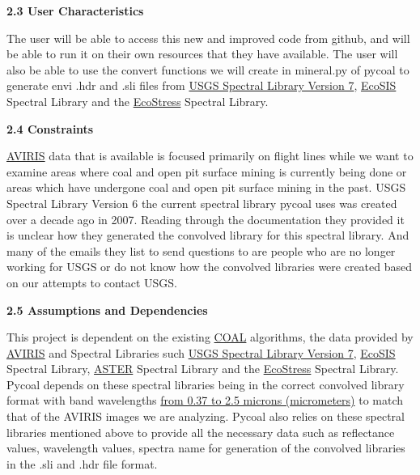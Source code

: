\documentclass[a4paper,12pt]{article}
\begin{document}
\noindent \textbf{2.3 User Characteristics}\newline


\noindent The user will be able to access this new and improved code from github, and will be able to run it on their own resources that they have available.\newline
\noindent The user will also be able to use the convert functions we will create in mineral.py of pycoal to generate envi .hdr and .sli files from \href{https://speclab.cr.usgs.gov/spectral-lib.html}{USGS Spectral Library Version 7}, \href{https://ecosis.org/}{EcoSIS} Spectral Library and the \href{https://speclib.jpl.nasa.gov/}{EcoStress} Spectral Library. \newline


\noindent \textbf{2.4 Constraints}\newline

\noindent \href{https://aviris.jpl.nasa.gov/}{AVIRIS} data that is available is focused primarily on flight lines while we want to examine areas where coal and open pit surface mining is currently being done or areas which have undergone coal and open pit surface mining in the past. \newline
\noindent USGS Spectral Library Version 6 the current spectral library pycoal uses was created over a decade ago in 2007. Reading through the documentation they provided it is unclear how they generated the convolved library for this spectral library. And many of the emails they list to send questions to are people who are no longer working for USGS or do not know how the convolved libraries were created based on our attempts to contact USGS. \newline


\noindent \textbf{2.5 Assumptions and Dependencies}\newline


\noindent This project is dependent on the existing \href{https://capstone-coal.github.io/}{COAL} algorithms, the data provided by \href{https://aviris.jpl.nasa.gov/}{AVIRIS} and Spectral Libraries such \href{https://speclab.cr.usgs.gov/spectral-lib.html}{USGS Spectral Library Version 7}, \href{https://ecosis.org/}{EcoSIS} Spectral Library, \href{https://speclib.jpl.nasa.gov/downloads/2009-Baldridge.pdf}{ASTER} Spectral Library and the \href{https://speclib.jpl.nasa.gov/}{EcoStress} Spectral Library.\newline
\newline
Pycoal depends on these spectral libraries being in the correct convolved library format with band wavelengths \href{https://pubs.usgs.gov/of/2001/ofr-01-0405/ofr-01-0405.html}{from 0.37 to 2.5 microns (micrometers)} to match that of the AVIRIS images we are analyzing. Pycoal also relies on these spectral libraries mentioned above to provide all the necessary data such as reflectance values, wavelength values, spectra name for generation of the convolved libraries in the .sli and .hdr file format. \newline
\end{document}
